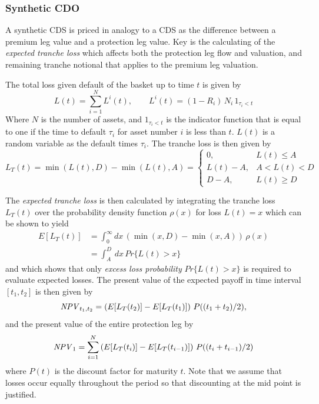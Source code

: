 \subsubsection{Synthetic CDO}
\label{ss:syntheticcdo} 

A synthetic CDS is priced in analogy to a CDS as the difference
between a premium leg value and a protection leg value. Key is 
the calculating of the {\em expected tranche loss} which affects both
the protection leg flow and valuation, and  remaining tranche notional 
that applies to the premium leg valuation.

\medskip
The total loss given default of the basket up to time $t$ is given by
$$
L(t) = \sum_{i=1}^N L^i(t),\qquad 
	L^i(t) = (1-R_i)\,N_i\,1_{\tau_i < t} 
$$ 
Where $N$ is the number of assets, and $1_{\tau_i < t}$ is the
indicator function that is equal to one if the time to default
$\tau_i$ for asset number $i$ is less than $t$. 
$L(t)$ is a random variable as the default times $\tau_i$.
 The tranche loss is then given by
$$ L_T(t) = \min(L(t),D) - \min(L(t),A) =  \left\{
  \begin{array}{ll}
  \displaystyle 0, & L(t) \leq A \\
  \displaystyle L(t) - A, & A < L(t) < D \\
  \displaystyle D - A, & L(t) \geq D
  \end{array}
  \right.
$$
 
The {\em expected tranche loss} is then calculated by integrating the 
tranche loss $L_T(t)$ over the probability density function $\rho(x)$
for loss $L(t)=x$
which can be shown to yield
\begin{align*} 
E[L_T(t)] &= \int_0^\infty dx \,(\min(x,D) - \min(x,A))\,\rho(x) \nonumber\\
 &= \int_A^D\,dx \,Pr\{L(t)>x\} 
\end{align*}
and which shows that only {\em excess loss probability} $Pr\{L(t)>x\}$
is required to evaluate expected losses.
The present value of the expected payoff in time interval $[t_1, t_2]$
is then given by
$$
	\mathit{NPV}_{t_1,t_2} = \left(E[L_T(t_2)] - E[L_T(t_1)]\right)\,P((t_1+t_2)/2), 
$$
and the present value of the entire protection leg by
$$ 
	\mathit{NPV}_1 = \sum_{i=1}^N \left(E[L_T(t_i)] - E[L_T(t_{i-1})]\right)
		\,P((t_i+t_{i-1})/2) 
$$
where $P(t)$ is the discount factor for maturity $t$. 
Note that we assume that losses occur equally throughout the period 
so that discounting at the mid point is justified.  

